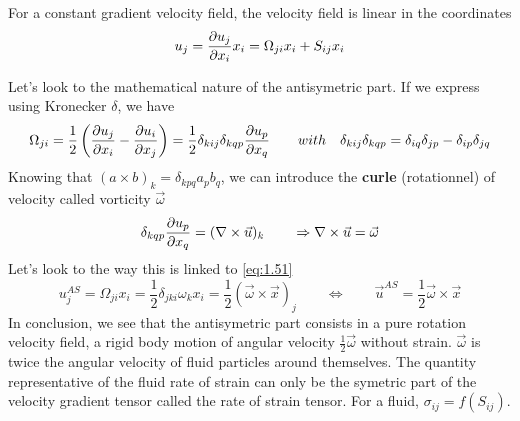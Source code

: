 		For a constant gradient velocity field, the velocity field is linear in the coordinates
		\begin{equation}
			u_j = \frac{\D u_j}{\D x_i}x_i = \Omega _{ji} x_i + S _{ij} x_i
			\label{eq:1.51}
		\end{equation}
		
		Let's look to the mathematical nature of the antisymetric part.  If we express using Kronecker $\delta$, we have
		\begin{equation}
			\Omega _{ji} =\frac{1}{2} \left( \frac{\D u_j}{\D x_i} - \frac{\D u_i}{\D x_j} \right) = \frac{1}{2} \delta _{kij}\delta _{kqp} \frac{\D u_p}{\D x_q} \qquad 
			with \quad \delta _{kij}\delta _{kqp} = \delta _{iq}\delta _{jp} - \delta _{ip}\delta _{jq} 
		\end{equation}
		Knowing that $(a \times b)_k = \delta _{kpq} a_p b_q$, we can introduce the \textbf{curle} (rotationnel) of velocity called vorticity $\vec{\omega}$
		\begin{equation}
			\delta _{kqp} \frac{\D u_p}{\D x_q} = (\nabla \times \vec{u})_k \qquad \Rightarrow \nabla \times \vec{u} = \vec{\omega}
		\end{equation}		 
		Let's look to the way this is linked to \autoref{eq:1.51}
		\begin{equation}
			 u_j^{AS} = \Omega _{ji}x_i = \frac{1}{2} \delta _{jki} \omega _k x_i = \frac{1}{2} (\vec{\omega} \times \vec{x})_j
			\qquad \Leftrightarrow \qquad 
			\vec{u}^{AS} = \frac{1}{2} \vec{\omega}\times \vec{x}
		\end{equation}
	 	In conclusion, we see that the antisymetric part consists in a pure rotation velocity field, a rigid body motion of angular velocity $\frac{1}{2}\vec{\omega}$ without strain. $\vec{\omega}$ is twice the angular velocity of fluid particles around themselves. The quantity representative of the fluid rate of strain can only be the symetric part of the velocity gradient tensor called the rate of strain tensor. For a fluid, $\sigma _{ij} = f(S_{ij})$. \\
	 	
